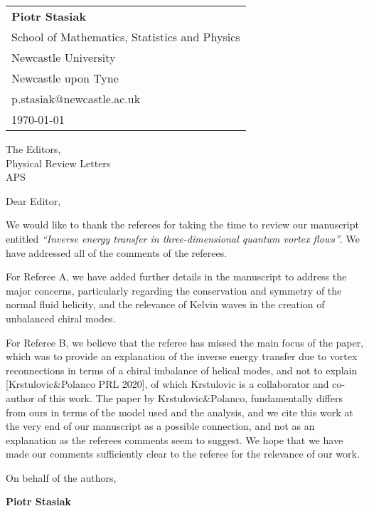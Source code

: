 \documentclass[a4paper,10pt]{letter}
\begin{document}
\begin{flushright}
    \begin{tabular}{l}
        \textbf{Piotr Stasiak} \\
        School of Mathematics, Statistics and Physics\\
        Newcastle University \\
        Newcastle  upon Tyne \\
        p.stasiak@newcastle.ac.uk \\
        \today
    \end{tabular}
\end{flushright}

\vspace{1cm}

The Editors,\\
Physical Review Letters\\
APS\\


\vspace{1cm}

Dear Editor,

\vspace{0.5cm}

We would like to thank the referees for taking the time to review our manuscript entitled \emph{``Inverse energy transfer in three-dimensional quantum vortex flows''}. We have addressed all of the comments of the referees. 

For Referee A, we have added further details in the manuscript to address the major concerns, particularly regarding the conservation and symmetry of the normal fluid helicity, and the relevance of Kelvin waves in the creation of unbalanced chiral modes. 

For Referee B, we believe that the referee has missed the main focus of the paper, which was to provide an explanation of the inverse energy transfer due to vortex reconnections in terms of a chiral imbalance of helical modes, and not to explain [Krstulovic\&Polanco PRL 2020], of which Krstulovic is a collaborator and co-author of this work. The paper by Krstulovic\&Polanco, fundamentally differs from ours in terms of the model used and the analysis, and we cite this work at the very end of our manuscript as a possible connection, and not as an explanation as the referees comments seem to suggest. We hope that we have made our comments sufficiently clear to the referee for the relevance of our work.

\vspace{0.5cm}

On behalf of the authors,

\vspace{1cm}

\textbf{Piotr Stasiak}
\end{document}
